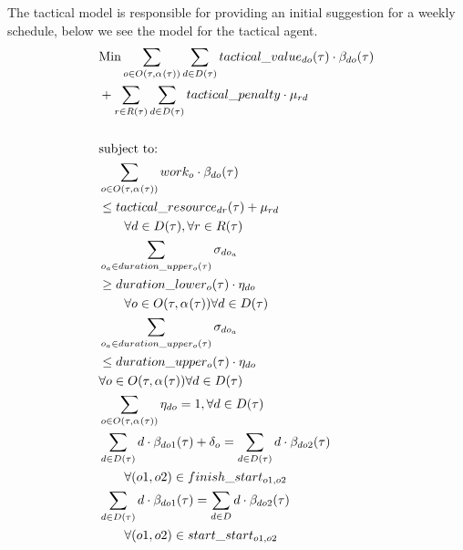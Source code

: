 The tactical model is responsible for providing an initial suggestion for a weekly schedule, below we see the model for the tactical agent.
\begin{alignat}{2}
     &\text{Min} \sum_{o \in \SetOperation} \sum_{d \in \SetDays} \ParTacticalValue \cdot \VarTacticalWork{o}\notag\\  
	          & + \sum_{r \in \SetResource} \sum_{d \in \SetDays} \ParTacticalPenalty \cdot \VarTacticalExcess                                               \\  
               \notag\\
               &\text{subject to:}                                                          \notag                                                                   \\
	           & \sum_{o \in \SetOperation} \ParOperationWork \cdot \VarTacticalWork{o}\notag\\
			   & \leq \ParTacticalResource + \VarTacticalExcess\notag\\ 
			   & \quad \quad \forall  d \in \SetDays, \forall r \in \SetResource\\ 
			   & \sum_{o_a \in \ParDurationUpper} \VarTacticalWorkBinary{o_a} \notag\\
			   & \geq \ParDurationLower \cdot \VarTacticalWorkBinaryConsecutive \notag\\ 
			   & \quad \quad \forall o \in \SetOperation \forall d \in \SetDays \\
			   & \sum_{o_a \in  \ParDurationUpper} \VarTacticalWorkBinary{o_a} \notag\\
			   & \leq \ParDurationUpper \cdot \VarTacticalWorkBinaryConsecutive \notag\\ 
			   & \forall o \in \SetOperation \forall d \in \SetDays \\
			   & \sum_{o \in \SetOperation} \VarTacticalWorkBinaryConsecutive = 1, \forall d \in \SetDays \notag\\
	           & \sum_{d \in \SetDays} d \cdot \VarTacticalWork{o1} + \delta_o  = \sum_{d \in \SetDays} d \cdot \VarTacticalWork{o2}                   \notag  \\ 
			   & \quad \quad \forall (o1, o2) \in \ParFinishStart                                                           \\ 
	           & \sum_{d \in \SetDays} d \cdot \VarTacticalWork{o1} = \sum_{d \in D} d \cdot \VarTacticalWork{o2}  \notag                               \\ 
			   & \quad \quad \forall (o1, o2) \in \ParStartStart                                                       \\ 

\end{alignat}
